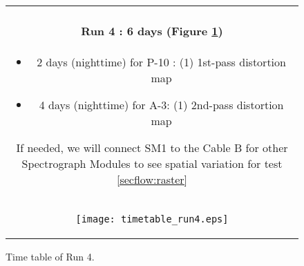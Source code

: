 \begin{figure}[!ht]
\begin{center}
\begin{tabular}{c}
\begin{minipage}{0.95\hsize}
\paragraph{Run 4 : 6 days  (Figure \ref{fig:run4})}
	\begin{itemize}
	\item 2 days (nighttime) for P-10 : 
	(1) 1st-pass distortion map
	\item 4 days (nighttime) for A-3: 
	(1) 2nd-pass distortion map
	\end{itemize}
If needed, we will connect SM1 to the Cable B for other Spectrograph Modules to see spatial variation for test \ref{secflow:raster}
\end{minipage} \\
\begin{minipage}{0.8\hsize}
	\begin{center}
	\vspace*{5mm}
	\texttt{[image: timetable\_run4.eps]}
	\end{center}
	\vspace*{-5mm}
	\caption{Time table of Run 4.}
	\label{fig:run4}
\end{minipage}
\end{tabular}
\end{center}
\end{figure}


